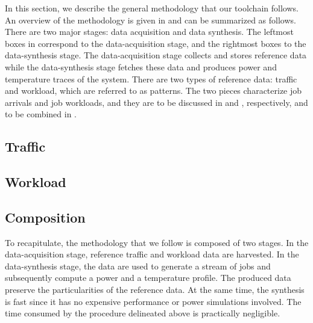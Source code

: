 In this section, we describe the general methodology that our toolchain follows.
An overview of the methodology is given in  and can be
summarized as follows. There are two major stages: data acquisition and data
synthesis. The leftmost boxes in  correspond to the
data-acquisition stage, and the rightmost boxes to the data-synthesis stage. The
data-acquisition stage collects and stores reference data while the
data-synthesis stage fetches these data and produces power and temperature
traces of the system. There are two types of reference data: traffic and
workload, which are referred to as patterns. The two pieces characterize job
arrivals and job workloads, and they are to be discussed in  and
, respectively, and to be combined in .

\subsection{Traffic} 


\subsection{Workload} 


\subsection{Composition} 


To recapitulate, the methodology that we follow is composed of two stages. In
the data-acquisition stage, reference traffic and workload data are harvested.
In the data-synthesis stage, the data are used to generate a stream of jobs and
subsequently compute a power and a temperature profile. The produced data
preserve the particularities of the reference data. At the same time, the
synthesis is fast since it has no expensive performance or power simulations
involved. The time consumed by the procedure delineated above is practically
negligible.
